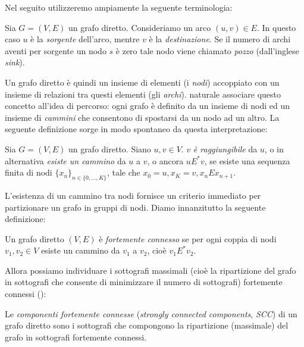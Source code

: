 Nel seguito utilizzeremo ampiamente la seguente terminologia:
\begin{definition}
    Sia $G = (V,E)$ un grafo diretto. Consideriamo un arco $(u,v) \in E$. In questo caso $u$ è la \emph{sorgente} dell'arco, mentre $v$ è la \emph{destinazione}. Se il numero di archi aventi per sorgente un nodo $s$ è zero tale nodo viene chiamato \emph{pozzo} (dall'inglese \emph{sink}).
\end{definition}
Un grafo diretto è quindi un insieme di elementi (i \emph{nodi}) accoppiato con un insieme di relazioni tra questi elementi (gli \emph{archi}). \accente naturale associare questo concetto all'idea di percorso: ogni grafo è definito da un insieme di nodi ed un insieme di \emph{cammini} che consentono di spostarsi da un nodo ad un altro. La seguente definizione sorge in modo spontaneo da questa interpretazione:
\begin{definition}
    Sia $G = (V, E)$ un grafo diretto. Siano $u,v \in V$. $v$ \emph{è raggiungibile} da $u$, o in alternativa \emph{esiste un cammino} da $u$ a $v$, o ancora $u E^{*} v$, se esiste una sequenza finita di nodi $\displaystyle \{x_n\}_{n \in \{0,\dots,K\}}$, tale che $x_0 = u, x_K = v, x_n E x_{n+1}$.
\end{definition}
L'esistenza di un cammino tra nodi fornisce un criterio immediato per partizionare un grafo in gruppi di nodi. Diamo innanzitutto la seguente definizione:
\begin{definition}
    Un grafo diretto $(V,E)$ è \emph{fortemente connesso} se per ogni coppia di nodi $v_1, v_2 \in V$ esiste un cammino da $v_1$ a $v_2$, cioè $v_1 E^{*} v_2$.
\end{definition}
Allora possiamo individuare i sottografi massimali (cioè la ripartizione del grafo in sottografi che consente di minimizzare il numero di sottografi) fortemente connessi (\hspace*{-0.1cm}\cite[Appendice B]{clrs}):
\begin{definition}
    Le \emph{componenti fortemente connesse} (\emph{strongly connected components}, \emph{SCC}) di un grafo diretto sono i sottografi che compongono la ripartizione (massimale) del grafo in sottografi fortemente connessi.
\end{definition}
